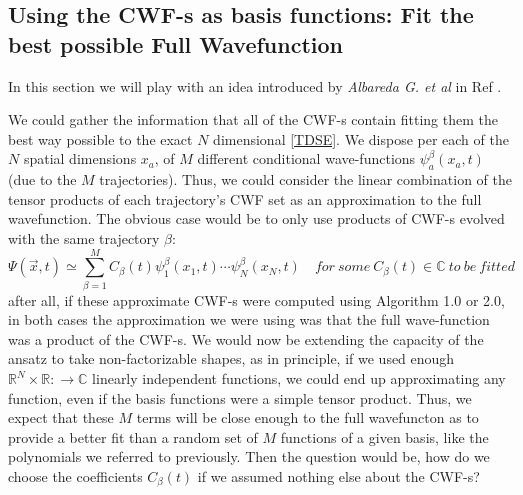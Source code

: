 \documentclass[11pt, a4paper]{article} %
\newcommand{\R}{\mathbb{R}} %
\newcommand{\C}{\mathbb{C}}
\begin{document}
\subsection{Using the CWF-s as basis functions: Fit the best possible Full Wavefunction}

In this section we will play with an idea introduced by {\em Albareda G. et al} in Ref \cite{Albareda}.

We could gather the information that all of the CWF-s contain fitting them the best way possible to the exact $N$ dimensional \ref{TDSE}. We dispose per each of the $N$ spatial dimensions $x_a$, of $M$ different conditional wave-functions $\psi^\beta_a(x_a,t)$ (due to the $M$ trajectories). Thus, we could consider the linear combination of the tensor products of each trajectory's CWF set as an approximation to the full wavefunction. The obvious case would be to only use products of CWF-s evolved with the same trajectory $\beta$:
$$
\Psi(\vec{x},t)\simeq \sum_{\beta=1}^{M} C_\beta(t) \psi^\beta_1(x_1,t)\cdots \psi^\beta_N(x_N,t) \quad for\ some\ C_\beta(t)\in \C\ to\ be\ fitted
$$
after all, if these approximate CWF-s were computed using Algorithm 1.0 or 2.0, in both cases the approximation we were using was that the full wave-function was a product of the CWF-s. We would now be extending the capacity of the ansatz to take non-factorizable shapes, as in principle, if we used enough $\R^N \times \R:\rightarrow \C$ linearly independent functions, we could end up approximating any function, even if the basis functions were a simple tensor product. Thus, we expect that these $M$ terms will be close enough to the full wavefuncton as to provide a better fit than a random set of $M$ functions of a given basis, like the polynomials we referred to previously. Then the question would be, how do we choose the coefficients $C_\beta (t)$ if we assumed nothing else about the CWF-s?
\end{document}
